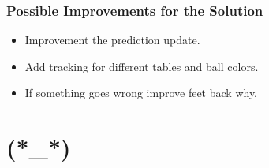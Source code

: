 \documentclass{beamer}
\begin{document}
\begin{frame}
	\frametitle{Possible Improvements for the Solution}
	\begin{itemize}
		\item Improvement the prediction update.
		\item Add tracking for different tables and ball colors. 
		\item If something goes wrong improve feet back why.
	\end{itemize}
\end{frame}


\section{(*\_*)}

\end{document}
